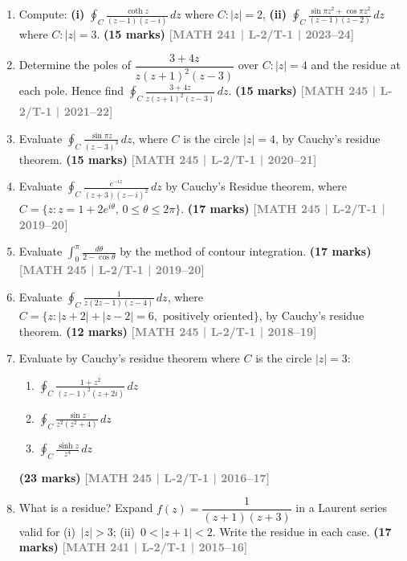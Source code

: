 \documentclass[12pt]{article}
\newcommand{\yr}[1]{\hfill\textcolor{gray}{\small\textbf{[#1]}}}
\newcommand{\mk}[1]{\textcolor{orange!70!black}{\small\textbf{(#1 marks)}}}
\begin{document}
\begin{enumerate}

  
\item Compute: \textbf{(i)} $\displaystyle\oint_{C}\frac{\coth z}{(z-1)(z-i)}\,dz$ where $C:|z|=2$, \quad \textbf{(ii)} $\displaystyle\oint_{C}\frac{\sin\pi z^{2}+\cos\pi z^{2}}{(z-1)(z-2)}\,dz$ where $C:|z|=3$.
\mk{15} \yr{MATH 241 | L-2/T-1 | 2023--24}

\item Determine the poles of $\dfrac{3+4z}{z(z+1)^{2}(z-3)}$ over $C:|z|=4$ and the residue at each pole. Hence find $\displaystyle\oint_{C}\frac{3+4z}{z(z+1)^{2}(z-3)}\,dz$.
\mk{15} \yr{MATH 245 | L-2/T-1 | 2021--22}

\item Evaluate $\displaystyle\oint_{C} \frac{\sin\pi z}{(z-3)^{3}}\,dz$, where $C$ is the circle $|z|=4$, by Cauchy's residue theorem.
\mk{15} \yr{MATH 245 | L-2/T-1 | 2020--21}

\item Evaluate $\displaystyle\oint_{C}\frac{e^{-iz}}{(z+3)(z-i)^{2}}\,dz$ by Cauchy's Residue theorem, where $C=\{z:z=1+2e^{i\theta},\,0\le\theta\le 2\pi\}$.
\mk{17} \yr{MATH 245 | L-2/T-1 | 2019--20}

\item Evaluate $\displaystyle\int_{0}^{\pi}\frac{d\theta}{2-\cos\theta}$ by the method of contour integration.
\mk{17} \yr{MATH 245 | L-2/T-1 | 2019--20}

\item Evaluate $\displaystyle\oint_{C}\frac{1}{z(2z-1)(z-4)}\,dz$, where $C=\{z:|z+2|+|z-2|=6,\text{ positively oriented}\}$, by Cauchy's residue theorem.
\mk{12} \yr{MATH 245 | L-2/T-1 | 2018--19}

\item Evaluate by Cauchy's residue theorem where $C$ is the circle $|z|=3$:
\begin{enumerate}
  \item $\displaystyle\oint_{C}\frac{1+z^{2}}{(z-1)^{2}(z+2i)}\,dz$
  \item $\displaystyle\oint_{C}\frac{\sin z}{z^{2}(z^{2}+4)}\,dz$
  \item $\displaystyle\oint_{C}\frac{\sinh z}{z^{4}}\,dz$
\end{enumerate}
\mk{23} \yr{MATH 245 | L-2/T-1 | 2016--17}

\item What is a residue? Expand $f(z)=\dfrac{1}{(z+1)(z+3)}$ in a Laurent series valid for (i)~$|z|>3$; (ii)~$0<|z+1|<2$. Write the residue in each case.
\mk{17} \yr{MATH 241 | L-2/T-1 | 2015--16}


\end{enumerate}
\end{document}
